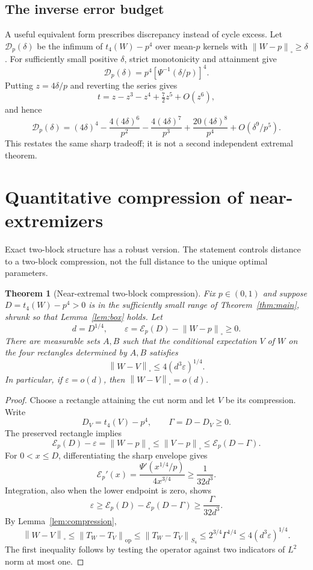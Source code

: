 \documentclass[11pt]{article}
\newtheorem{theorem}{Theorem}[section]
\theoremstyle{definition}
\newcommand{\1}{\mathbf 1}
\newcommand{\Cut}[1]{\left\|#1\right\|_{\square}}
\newcommand{\Sfour}[1]{\left\|#1\right\|_{S_4}}
\newcommand{\op}[1]{\left\|#1\right\|_{\mathrm{op}}}
\newcommand{\calE}{\mathcal E}
\begin{document}
\subsection{The inverse error budget}
A useful equivalent form prescribes discrepancy instead of cycle excess. Let $\mathcal D_p(\delta)$ be the infimum of $t_4(W)-p^4$ over mean-$p$ kernels with $\Cut{W-p}\ge\delta$. For sufficiently small positive $\delta$, strict monotonicity and attainment give
\[
 \mathcal D_p(\delta)=p^4[\Psi^{-1}(\delta/p)]^4.
\]
Putting $z=4\delta/p$ and reverting the series gives
\[
 t=z-z^3-z^4+\tfrac72z^5+O(z^6),
\]
and hence
\begin{equation}\label{eq:inverse}
 \mathcal D_p(\delta)=(4\delta)^4
 -\frac{4(4\delta)^6}{p^2}-\frac{4(4\delta)^7}{p^3}
 +\frac{20(4\delta)^8}{p^4}
 +O(\delta^9/p^5).
\end{equation}
This restates the same sharp tradeoff; it is not a second independent extremal theorem.

\section{Quantitative compression of near-extremizers}\label{sec:stability}
Exact two-block structure has a robust version. The statement controls distance to a two-block compression, not the full distance to the unique optimal parameters.

\begin{theorem}[Near-extremal two-block compression]\label{thm:stability}
Fix $p\in(0,1)$ and suppose $D=t_4(W)-p^4>0$ is in the sufficiently small range of Theorem~\ref{thm:main}, shrunk so that Lemma~\ref{lem:box} holds. Let
\[
 d=D^{1/4},\qquad \varepsilon=\calE_p(D)-\Cut{W-p}\ge0.
\]
There are measurable sets $A,B$ such that the conditional expectation $V$ of $W$ on the four rectangles determined by $A,B$ satisfies
\begin{equation}\label{eq:stability}
 \Cut{W-V}\le4(d^3\varepsilon)^{1/4}.
\end{equation}
In particular, if $\varepsilon=o(d)$, then $\Cut{W-V}=o(d)$.
\end{theorem}
\begin{proof}
Choose a rectangle attaining the cut norm and let $V$ be its compression. Write
\[
 D_V=t_4(V)-p^4,\qquad \Gamma=D-D_V\ge0.
\]
The preserved rectangle implies
\[
 \calE_p(D)-\varepsilon=\Cut{W-p}\le\Cut{V-p}\le\calE_p(D-\Gamma).
\]
For $0<x\le D$, differentiating the sharp envelope gives
\[
 \calE_p'(x)=\frac{\Psi'(x^{1/4}/p)}{4x^{3/4}}
       \ge\frac1{32d^3}.
\]
Integration, also when the lower endpoint is zero, shows
\[
 \varepsilon\ge\calE_p(D)-\calE_p(D-\Gamma)
                \ge\frac{\Gamma}{32d^3}.
\]
By Lemma~\ref{lem:compression},
\[
 \Cut{W-V}\le\op{T_W-T_V}\le\Sfour{T_W-T_V}
 \le2^{3/4}\Gamma^{1/4}\le4(d^3\varepsilon)^{1/4}.
\]
The first inequality follows by testing the operator against two indicators of $L^2$ norm at most one.
\end{proof}
\end{document}
